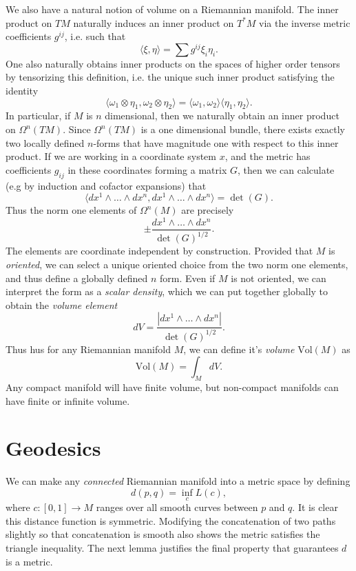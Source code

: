 We also have a natural notion of volume on a Riemannian manifold. The inner product on $TM$ naturally induces an inner product on $T^*M$ via the inverse metric coefficients $g^{ij}$, i.e. such that
%
\[ \langle \xi, \eta \rangle = \sum g^{ij} \xi_i \eta_i. \]
%
One also naturally obtains inner products on the spaces of higher order tensors by tensorizing this definition, i.e. the unique such inner product satisfying the identity
%
\[ \langle \omega_1 \otimes \eta_1, \omega_2 \otimes \eta_2 \rangle = \langle \omega_1, \omega_2 \rangle \langle \eta_1, \eta_2 \rangle. \]
%
In particular, if $M$ is $n$ dimensional, then we naturally obtain an inner product on $\Omega^n(TM)$. Since $\Omega^n(TM)$ is a one dimensional bundle, there exists exactly two locally defined $n$-forms that have magnitude one with respect to this inner product. If we are working in a coordinate system $x$, and the metric has coefficients $g_{ij}$ in these coordinates forming a matrix $G$, then we can calculate (e.g by induction and cofactor expansions) that
%
\[ \langle dx^1 \wedge \dots \wedge dx^n, dx^1 \wedge \dots \wedge dx^n \rangle = \det(G). \]
%
Thus the norm one elements of $\Omega^n(M)$ are precisely
%
\[ \pm \frac{dx^1 \wedge \dots \wedge dx^n}{\det(G)^{1/2}}. \]
%
The elements are coordinate independent by construction. Provided that $M$ is \emph{oriented}, we can select a unique oriented choice from the two norm one elements, and thus define a globally defined $n$ form. Even if $M$ is not oriented, we can interpret the form as a \emph{scalar density}, which we can put together globally to obtain the \emph{volume element}
%
\[ dV = \frac{|dx^1 \wedge \dots \wedge dx^n|}{\det(G)^{1/2}}. \]
%
Thus hus for any Riemannian manifold $M$, we can define it's \emph{volume} $\text{Vol}(M)$ as
%
\[ \text{Vol}(M) = \int_M dV. \]
%
Any compact manifold will have finite volume, but non-compact manifolds can have finite or infinite volume.

\section{Geodesics}

We can make any \emph{connected} Riemannian manifold into a metric space by defining
%
\[ d(p,q) = \inf_c L(c), \]
%
where $c: [0,1] \to M$ ranges over all smooth curves between $p$ and $q$. It is clear this distance function is symmetric. Modifying the concatenation of two paths slightly so that concatenation is smooth also shows the metric satisfies the triangle inequality. The next lemma justifies the final property that guarantees $d$ is a metric.

